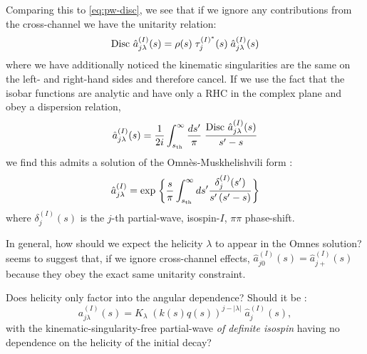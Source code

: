 Comparing this to \cref{eq:pw-disc}, we see that if we ignore any contributions from the cross-channel we have the unitarity relation:
  \begin{equation}
    \label{omnes-unitarity}
    \text{Disc } \hat{a}^{(I)}_{j\lambda}(s) = \rho(s) \; {\tau}^{(I)^*}_j(s) \; \hat{a}_{j\lambda}^{(I)}(s)
  \end{equation}
where we have additionally noticed the kinematic singularities are the same on the left- and right-hand sides and therefore cancel. If we use the fact that the isobar functions are analytic and have only a RHC in the complex plane and obey a dispersion relation,
  \begin{equation}
    \hat{a}_{j\lambda}^{(I)}(s) = \frac{1}{2i} \int_{s_\text{th}}^\infty \frac{ds^\prime}{\pi}
    \; \frac{
    \text{Disc } \hat{a}_{j\lambda}^{(I)}(s)
    }{
    s^\prime - s
    }
  \end{equation}
we find this admits a solution of the Omn\`{e}s-Muskhelishvili form \cite{Omnes1958,Kamal1979,1953sie..book.....M}:
  \begin{equation}
    \hat{a}_{j\lambda}^{(I)} = \text{exp} \;
    \bigg\{
    \frac{s}{\pi} \int_{{s_\text{th}}}^\infty ds^\prime
     \frac{
     \delta_{j}^{(I)}(s^\prime)
     }{
     s^\prime \, (s^\prime - s)
     }
    \bigg\}
  \end{equation}
where \(\delta_j^{(I)}(s)\) is the \(j\)-th partial-wave, isospin-\(I\), \(\pi\pi\) phase-shift.
{\color{red} In general, how should we expect the helicity \(\lambda\) to appear in the Omnes solution?  seems to suggest that, if we ignore cross-channel effects, \(\hat{a}^{(I)}_{j0}(s) = \hat{a}^{(I)}_{j+}(s)\) because they obey the exact same unitarity constraint.

Does helicity only factor into the angular dependence? Should it be :
\begin{equation}
    a^{(I)}_{j\lambda}(s) = K_\lambda \; (k(s)q(s))^{j-|\lambda|} \; \hat{a}^{(I)}_j(s),
\end{equation}
with the kinematic-singularity-free partial-wave \textit{of definite isospin} having no dependence on the helicity of the initial decay?
}
